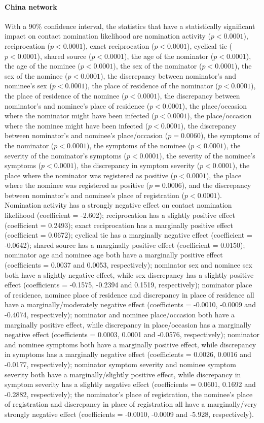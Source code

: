 \paragraph{China network} With a 90\% confidence interval, the statistics that have a statistically significant impact on contact nomination likelihood are nomination activity ($p<0.0001$), reciprocation ($p<0.0001$), exact reciprocation ($p<0.0001$), cyclical tie ($p<0.0001$), shared source ($p<0.0001$), the age of the nominator ($p<0.0001$), the age of the nominee ($p<0.0001$), the sex of the nominator ($p<0.0001$), the sex of the nominee ($p<0.0001$), the discrepancy between nominator's and nominee's sex ($p<0.0001$), the place of residence of the nominator ($p<0.0001$), the place of residence of the nominee ($p<0.0001$), the discrepancy between nominator's and nominee's place of residence ($p<0.0001$), the place/occasion where the nominator might have been infected ($p<0.0001$), the place/occasion where the nominee might have been infected ($p<0.0001$), the discrepancy between nominator's and nominee's place/occasion ($p=0.0060$), the symptoms of the nominator ($p<0.0001$), the symptoms of the nominee ($p<0.0001$), the severity of the nominator's symptoms ($p<0.0001$), the severity of the nominee's symptoms ($p<0.0001$), the discrepancy in symptom severity ($p<0.0001$), the place where the nominator was registered as positive ($p<0.0001$), the place where the nominee was registered as positive ($p=0.0006$), and the discrepancy between nominator's and nominee's place of registration ($p<0.0001$). Nomination activity has a strongly negative effect on contact nomination likelihood (coefficient = -2.602); reciprocation has a slightly positive effect (coefficient = 0.2493); exact reciprocation has a marginally positive effect (coefficient = 0.0672); cyclical tie has a marginally negative effect (coefficient = -0.0642); shared source has a marginally positive effect (coefficient = 0.0150); nominator age and nominee age both have a marginally positive effect (coefficients = 0.0037 and 0.0053, respectively); nominator sex and nominee sex both have a slightly negative effect, while sex discrepancy has a slightly positive effect (coefficients = -0.1575, -0.2394 and 0.1519, respectively); nominator place of residence, nominee place of residence and discrepancy in place of residence all have a marginally/moderately negative effect (coefficients = -0.0010, -0.0009 and -0.4074, respectively); nominator and nominee place/occasion both have a marginally positive effect, while discrepancy in place/occasion has a marginally negative effect (coefficients = 0.0003, 0.0001 and -0.0576, respectively); nominator and nominee symptoms both have a marginally positive effect, while discrepancy in symptoms has a marginally negative effect (coefficients = 0.0026, 0.0016 and -0.0177, respectively); nominator symptom severity and nominee symptom severity both have a marginally/slightly positive effect, while discrepancy in symptom severity has a slightly negative effect (coefficients = 0.0601, 0.1692 and -0.2882, respectively); the nominator's place of registration, the nominee's place of registration and discrepancy in place of registration all have a marginally/very strongly negative effect (coefficients = -0.0010, -0.0009 and -5.928, respectively).
